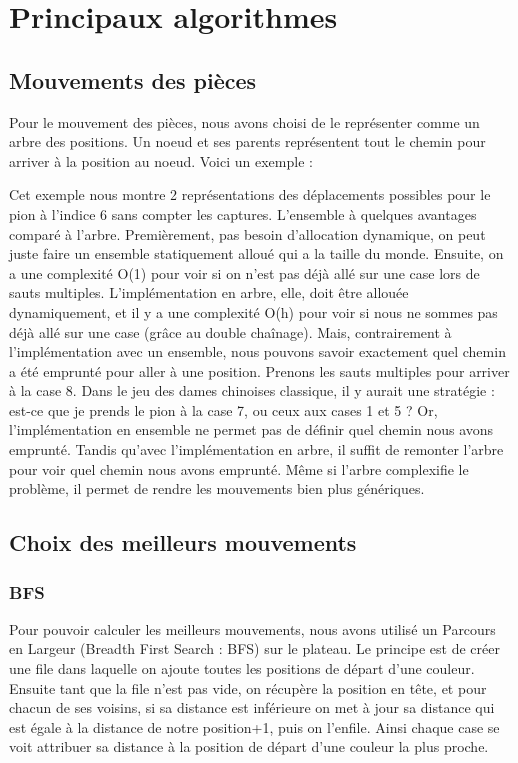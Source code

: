 \section{Principaux algorithmes}
\subsection{Mouvements des pièces}
Pour le mouvement des pièces, nous avons choisi de le représenter comme
un arbre des positions. Un noeud et ses parents représentent tout le 
chemin pour arriver à la position au noeud. Voici un exemple :



Cet exemple nous montre 2 représentations des déplacements possibles pour
le pion à l'indice 6 sans compter les captures. L'ensemble à quelques avantages comparé à l'arbre.
Premièrement, pas besoin d'allocation dynamique, on peut juste faire un ensemble statiquement alloué
qui a la taille du monde. Ensuite, on a une complexité O(1) pour voir si on n'est pas déjà allé sur une case
lors de sauts multiples. L'implémentation en arbre, elle, doit être allouée dynamiquement,
et il y a une complexité O(h) pour voir si nous ne sommes pas déjà allé sur une case (grâce au double chaînage).
Mais, contrairement à l'implémentation avec un ensemble, nous pouvons savoir
exactement quel chemin a été emprunté pour aller à une position. Prenons les sauts
multiples pour arriver à la case 8. Dans le jeu des dames chinoises classique,
il y aurait une stratégie : est-ce que je prends le pion à la case 7, ou ceux aux cases 1 et 5 ?
Or, l'implémentation en ensemble ne permet pas de définir quel chemin nous avons emprunté.
Tandis qu'avec l'implémentation en arbre, il suffit de remonter l'arbre pour voir quel chemin nous avons emprunté.
Même si l'arbre complexifie le problème, il permet de rendre les mouvements bien plus génériques.


\subsection{Choix des meilleurs mouvements}
\subsubsection{BFS}
Pour pouvoir calculer les meilleurs mouvements, nous avons utilisé un Parcours en Largeur (Breadth First Search : BFS) sur le plateau. 
Le principe est de créer une file dans laquelle on ajoute toutes les positions de départ d'une couleur.
Ensuite tant que la file n'est pas vide, on récupère la position en tête, et pour chacun de ses voisins, 
si sa distance est inférieure on met à jour sa distance qui est égale à la distance de notre position+1,
puis on l'enfile.
Ainsi chaque case se voit attribuer sa distance à la position de départ d'une couleur la plus proche. 
 
